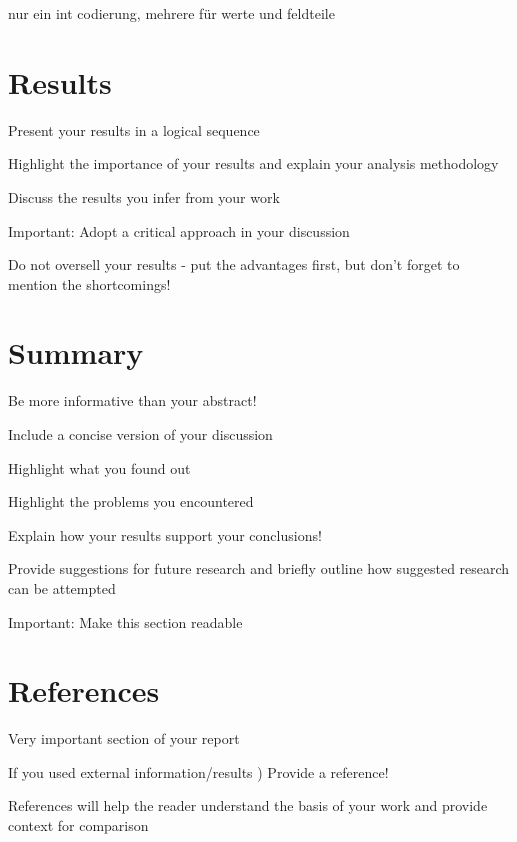 \documentclass[lnicst,a4paper]{svmultln}
\begin{document}
nur ein int
codierung, mehrere für werte und feldteile


\section{Results}

Present your results in a logical sequence

Highlight the importance of your results and explain your
analysis methodology

Discuss the results you infer from your work

Important:
Adopt a critical approach in your discussion

Do not oversell your results - put the advantages first, but
don’t forget to mention the shortcomings!





\section{Summary}

Be more informative than your abstract!

Include a concise version of your discussion

Highlight what you found out

Highlight the problems you encountered

Explain how your results support your conclusions!

Provide suggestions for future research and briefly outline how
suggested research can be attempted

Important:
Make this section readable





\section{References}
Very important section of your report

If you used external information/results
)
Provide a
reference!

References will help the reader understand the basis of your
work and provide context for comparison
\end{document}
